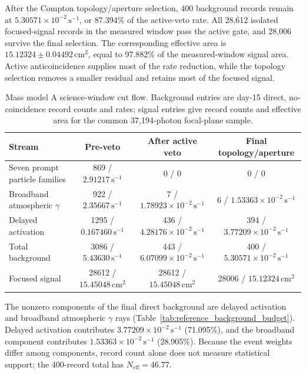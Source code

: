 \documentclass[11pt]{article}
\newcommand{\cps}{\ensuremath{\,\mathrm{s^{-1}}}}
\begin{document}
After the Compton topology/aperture selection, 400 background records remain at $5.30571\times10^{-2}\cps$, or 87.394\% of the active-veto rate. All 28,612 isolated focused-signal records in the measured window pass the active gate, and 28,006 survive the final selection. The corresponding effective area is $15.12324\pm0.04492\,\mathrm{cm^2}$, equal to 97.882\% of the measured-window signal area. Active anticoincidence supplies most of the rate reduction, while the topology selection removes a smaller residual and retains most of the focused signal.

\begin{table}[H]
\centering
\caption{Mass model A science-window cut flow. Background entries are day-15 direct, no-coincidence record counts and rates; signal entries give record counts and effective area for the common 37,194-photon focal-plane sample.}
\label{tab:phase2_cutflow}
\footnotesize
\begin{tabular}{lccc}
\toprule
Stream & Pre-veto & After active veto & Final topology/aperture \\
\midrule
Seven prompt particle families & 869 / $2.91217\cps$ & 0 / 0 & 0 / 0 \\
Broadband atmospheric $\gamma$ & 922 / $2.35667\cps$ & 7 / $1.78923\times10^{-2}\cps$ & 6 / $1.53363\times10^{-2}\cps$ \\
Delayed activation & 1295 / $0.167460\cps$ & 436 / $4.28176\times10^{-2}\cps$ & 394 / $3.77209\times10^{-2}\cps$ \\
Total background & 3086 / $5.43630\cps$ & 443 / $6.07099\times10^{-2}\cps$ & 400 / $5.30571\times10^{-2}\cps$ \\
Focused signal & 28612 / $15.45048\,\mathrm{cm^2}$ & 28612 / $15.45048\,\mathrm{cm^2}$ & 28006 / $15.12324\,\mathrm{cm^2}$ \\
\bottomrule
\end{tabular}
\end{table}

The nonzero components of the final direct background are delayed activation
and broadband atmospheric $\gamma$ rays
(Table~\ref{tab:reference_background_budget}). Delayed activation contributes
$3.77209\times10^{-2}\cps$ (71.095\%), and the broadband component contributes
$1.53363\times10^{-2}\cps$ (28.905\%). Because the event weights differ among
components, record count alone does not measure statistical support; the
400-record total has $N_{\mathrm{eff}}=46.77$.
\end{document}
